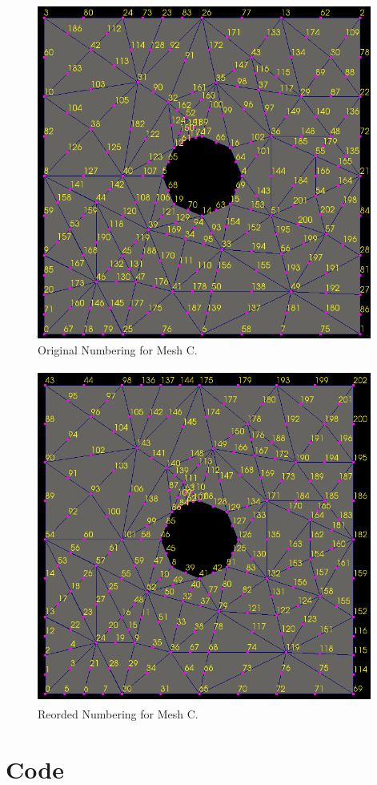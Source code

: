 \documentclass[a4paper, 12pt]{article}
\begin{document}
\begin{figure}[H]
  \centering
  \includegraphics[width=11cm, height=11cm]{orig_c}
  \caption{Original Numbering for Mesh C. }
  \label{fig_oc}
\end{figure}

\begin{figure}[H]
  \centering
  \includegraphics[width=11cm, height=11cm]{reorder_c} 
  \caption{Reorded Numbering for Mesh C. }
  \label{fig_rc}
\end{figure}

\newpage
\section*{Code} \label{sec:code}

\end{document}
